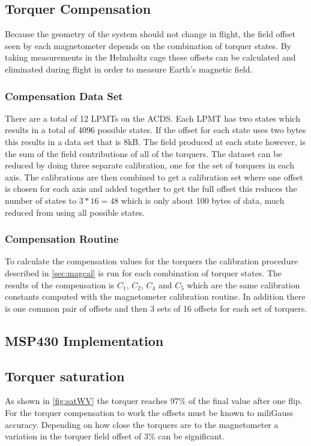 \subsection{Torquer Compensation}

Because the geometry of the system should not change in flight, the field offset seen by each magnetometer depends on the combination of torquer states. By taking measurements in the Helmholtz cage these offsets can be calculated and eliminated during flight in order to measure Earth's magnetic field.

\subsubsection{Compensation Data Set}

There are a total of 12 \acp{LPMT} on the \ac{ACDS}. Each \ac{LPMT} has two states which results in a total of 4096 possible states. If the offset for each state uses two bytes this results in a data set that is 8kB. The field produced at each state however, is the sum of the field contributions of all of the torquers. The dataset can be reduced by doing three separate calibration, one for the set of torquers in each axis. The calibrations are then combined to get a calibration set where one offset is chosen for each axis and added together to get the full offset this reduces the number of states to $3*16 = 48$ which is only about 100 bytes of data, much reduced from using all possible states.

\subsubsection{Compensation Routine}

To calculate the compensation values for the torquers the calibration procedure described in \cref{sec:magcal} is run for each combination of torquer states. The results of the compensation is $C_1$, $C_2$, $C_4$ and $ C_5$ which are the same calibration constants computed with the magnetometer calibration routine. In addition there is one common pair of offsets and then 3 sets of 16 offsets for each set of torquers.


\subsection{MSP430 Implementation}


\subsection{Torquer saturation}

As shown in \cref{fig:satWV} the torquer reaches 97\% of the final value after one flip. For the torquer compensation to work the offsets must be known to miliGauss accuracy. Depending on how close the torquers are to the magnetometer a variation in the torquer field offset of 3\% can be significant.

